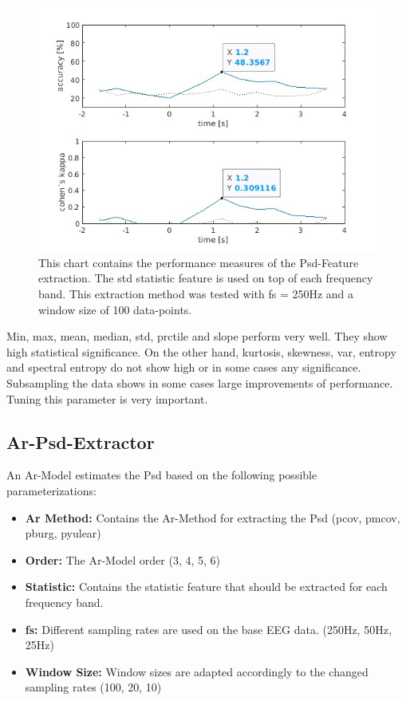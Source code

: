 \documentclass{article}
\begin{document}
\begin{figure}[H]
    \centering
    \includegraphics[width=\textwidth]{images/48.36-250hz-100-psd-statistic-std.jpg}
    \caption{This chart contains the performance measures of the Psd-Feature extraction. The std statistic feature is used on top of each frequency band. This extraction method was tested with fs = 250Hz and a window size of 100 data-points.}
\end{figure}

Min, max, mean, median, std, prctile and slope perform very well. They show high statistical significance. On the other hand, kurtosis, skewness, var, entropy and spectral entropy do not show high or in some cases any significance. Subsampling the data shows in some cases large improvements of performance. Tuning this parameter is very important.

\subsection{Ar-Psd-Extractor}
An Ar-Model estimates the Psd based on the following possible parameterizations:
\begin{itemize}
    \item \textbf{Ar Method:} Contains the Ar-Method for extracting the Psd (pcov, pmcov, pburg, pyulear)
    \item \textbf{Order:} The Ar-Model order (3, 4, 5, 6)
    \item \textbf{Statistic:} Contains the statistic feature that should be extracted for each frequency band.
    \item \textbf{fs:} Different sampling rates are used on the base EEG data. (250Hz, 50Hz, 25Hz)
    \item \textbf{Window Size:} Window sizes are adapted accordingly to the changed sampling rates (100, 20, 10)
\end{itemize}
\end{document}
